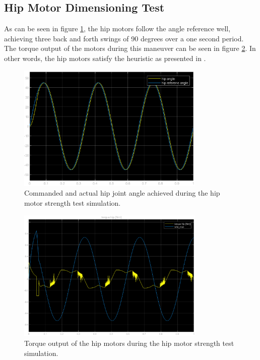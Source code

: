 \subsection{Hip Motor Dimensioning Test}
\label{sec:hip_motor_dimensioning_test}

As can be seen in figure \ref{fig:hip_motor_strength_test}, the hip motors follow the angle reference well, achieving three back and forth swings of 90 degrees over a one second period. The torque output of the motors during this maneuver can be seen in figure \ref{fig:hip_motor_torque_test}. In other words, the hip motors satisfy the heuristic as presented in \cite{finn_tarek_master}.

\begin{figure}[H]
    \centering
    \includegraphics[width=0.8\textwidth]{Images/attitude_stable_test_result.eps}
    \caption{Commanded and actual hip joint angle achieved during the hip motor strength test simulation. }
    \label{fig:hip_motor_strength_test}
\end{figure}

\begin{figure}[H]
    \centering
    \includegraphics[width=0.8\textwidth]{Images/hip_motor_torque.eps}
    \caption{Torque output of the hip motors during the hip motor strength test simulation.}
    \label{fig:hip_motor_torque_test}
\end{figure}

